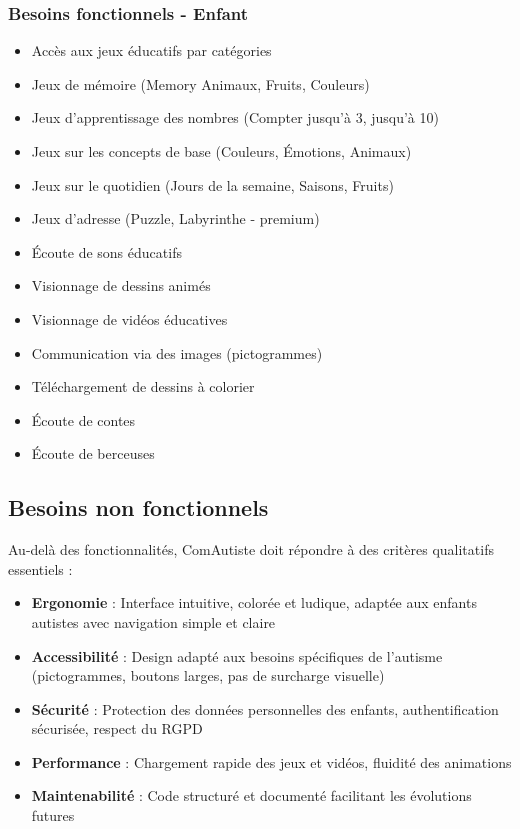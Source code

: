 \documentclass[12pt,a4paper]{report}
\begin{document}
\subsubsection{Besoins fonctionnels - Enfant}

\begin{itemize}
    \item Accès aux jeux éducatifs par catégories
    \item Jeux de mémoire (Memory Animaux, Fruits, Couleurs)
    \item Jeux d'apprentissage des nombres (Compter jusqu'à 3, jusqu'à 10)
    \item Jeux sur les concepts de base (Couleurs, Émotions, Animaux)
    \item Jeux sur le quotidien (Jours de la semaine, Saisons, Fruits)
    \item Jeux d'adresse (Puzzle, Labyrinthe - premium)
    \item Écoute de sons éducatifs
    \item Visionnage de dessins animés
    \item Visionnage de vidéos éducatives
    \item Communication via des images (pictogrammes)
    \item Téléchargement de dessins à colorier
    \item Écoute de contes
    \item Écoute de berceuses
\end{itemize}

\subsection{Besoins non fonctionnels}

Au-delà des fonctionnalités, ComAutiste doit répondre à des critères qualitatifs essentiels :

\begin{itemize}
    \item \textbf{Ergonomie} : Interface intuitive, colorée et ludique, adaptée aux enfants autistes avec navigation simple et claire
    \item \textbf{Accessibilité} : Design adapté aux besoins spécifiques de l'autisme (pictogrammes, boutons larges, pas de surcharge visuelle)
    \item \textbf{Sécurité} : Protection des données personnelles des enfants, authentification sécurisée, respect du RGPD
    \item \textbf{Performance} : Chargement rapide des jeux et vidéos, fluidité des animations
    \item \textbf{Maintenabilité} : Code structuré et documenté facilitant les évolutions futures
    
\end{itemize}
\end{document}
